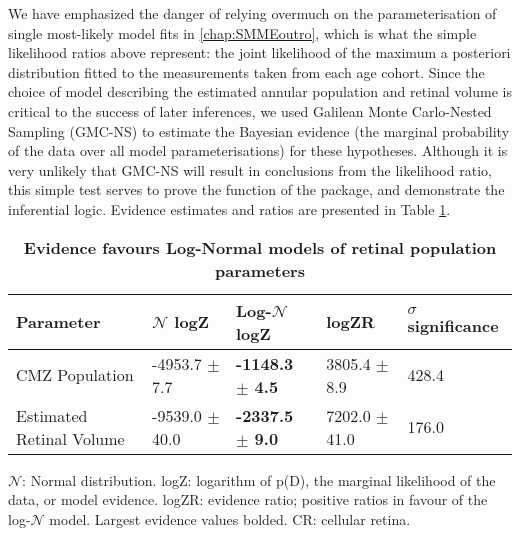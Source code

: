 We have emphasized the danger of relying overmuch on the parameterisation of single most-likely model fits in \autoref{chap:SMMEoutro}, which is what the simple likelihood ratios above represent: the joint likelihood of the maximum a posteriori distribution fitted to the measurements taken from each age cohort. Since the choice of model describing the estimated annular population and retinal volume is critical to the success of later inferences, we used Galilean Monte Carlo-Nested Sampling (GMC-NS) to estimate the Bayesian evidence (the marginal probability of the data over all model parameterisations) for these hypotheses. Although it is very unlikely that GMC-NS will result in conclusions from the likelihood ratio, this simple test serves to prove the function of the  package, and demonstrate the inferential logic. Evidence estimates and ratios are presented in Table \ref{PZRtable}.

\begin{table}[!ht]
    \centering
    \caption{
    {\bf Evidence favours Log-Normal models of retinal population parameters}}
    \begin{tabular}{|l|l|l|l|l|}
    \hline
    {\bf Parameter} & {\bf $\mathcal{N}$ logZ} & {\bf Log-$\mathcal{N}$ logZ} & {\bf logZR} & {\bf $\sigma$ significance}\\ \hline
    CMZ Population & -4953.7 $\pm$ 7.7 & {\bf -1148.3 $\pm$ 4.5} & 3805.4 $\pm$ 8.9 & 428.4\\ \hline
    Estimated Retinal Volume & -9539.0 $\pm$ 40.0 & {\bf -2337.5 $\pm$ 9.0} & 7202.0 $\pm$ 41.0 & 176.0\\ \hline
    \end{tabular}
    \begin{flushleft} $\mathcal{N}$: Normal distribution. logZ: logarithm of p(D), the marginal likelihood of the data, or model evidence. logZR: evidence ratio; positive ratios in favour of the log-$\mathcal{N}$ model. Largest evidence values bolded. CR: cellular retina.
    \end{flushleft}
    \label{PZRtable}
\end{table}

